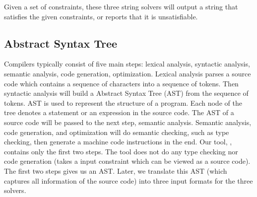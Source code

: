 Given a set of constraints, these three string solvers will output a string that satisfies the given constraints, or reports that it is unsatisfiable.

\subsection{Abstract Syntax Tree}
Compilers typically consist of five main steps: lexical analysis, syntactic analysis, semantic
analysis, code generation, optimization. Lexical analysis parses a source code which contains
a sequence of characters into a sequence of tokens. Then syntactic analysis will build a
Abstract Syntax Tree (AST) from the sequence of tokens. AST is used to represent the structure
of a program. Each node of the tree denotes a statement or an expression in the source code.
The AST of a source code will be passed to the next step, semantic analysis.
Semantic analysis, code generation, and optimization will do semantic checking, such as type checking,
then generate a machine code instructions in the end. Our tool, \imss, contains only the first two steps.
The tool does not do any type checking nor code generation (\imss takes a input constraint which can be
viewed as a source code). The first two steps gives us an AST.
Later, we translate this AST (which captures all information of the source code) into three input formats
for the three solvers.
